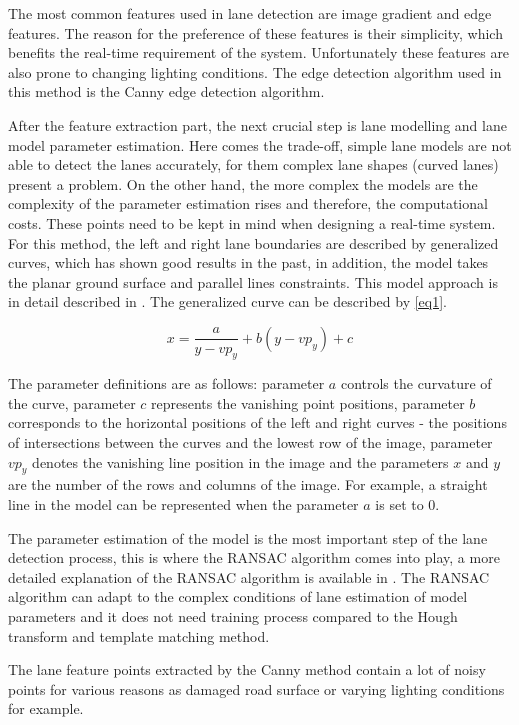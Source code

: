 \documentclass[conference]{IEEEtran}
\begin{document}
The most common features used in lane detection are image gradient and edge features. The reason for the preference of these features is their simplicity, which benefits the real-time requirement of the system. Unfortunately these features are also prone to changing lighting conditions. The edge detection algorithm used in this method is the Canny edge detection algorithm.

After the feature extraction part, the next crucial step is lane modelling and lane model parameter estimation. Here comes the trade-off, simple lane models are not able to detect the lanes accurately, for them complex lane shapes (curved lanes) present a problem. On the other hand, the more complex the models are the complexity of the parameter estimation rises and therefore, the computational costs. These points need to be kept in mind when designing a real-time system. For this method, the left and right lane boundaries are described by generalized curves, which has shown good results in the past, in addition, the model takes the planar ground surface and parallel lines constraints.  This model approach is in detail described in \cite{ransac1}. The generalized curve can be described by \ref{eq1}.

\begin{equation}
x = \frac{a}{y-vp_y}+b(y-vp_y) +c
\label{eq1}
\end{equation}

The parameter definitions are as follows: parameter $a$ controls the curvature of the curve, parameter $c$ represents the vanishing point positions, parameter $b$ corresponds to the horizontal positions of the left and right curves - the positions of intersections between the curves and the lowest row of the image, parameter $vp_y$ denotes the vanishing line position in the image and the parameters $x$ and $y$ are the number of the rows and columns of the image. For example, a straight line in the model can be represented when the parameter $a$ is set to 0. 

The parameter estimation of the model is the most important step of the lane detection process, this is where the RANSAC algorithm comes into play, a more detailed explanation of the RANSAC algorithm is available in \cite{ransac2}. The RANSAC algorithm can adapt to the
complex conditions of lane estimation of model parameters
and it does not need training process compared to the Hough
transform and template matching method.

The lane feature points extracted by the Canny method contain a lot of noisy points for various reasons as damaged road surface or varying lighting conditions for example. 
\end{document}
